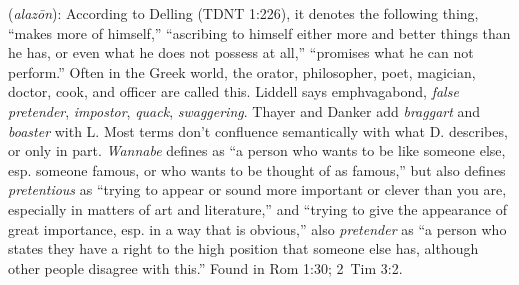 \item[Wannabe,]

(\textit{alazōn}):
According to Delling (TDNT 1:226), it denotes the following thing, ``makes more of himself,'' ``ascribing to himself either more and better things than he has, or even what he does not possess at all,'' ``promises what he can not perform.'' Often in the Greek world, the orator, philosopher, poet, magician, doctor, cook, and officer are called this. Liddell says emph{vagabond}, \emph{false pretender}, \emph{impostor}, \emph{quack}, \emph{swaggering}. Thayer and Danker add \emph{braggart} and \emph{boaster} with L. Most terms don't confluence semantically with what D. describes, or only in part. \emph{Wannabe} defines as ``a person who wants to be like someone else, esp. someone famous, or who wants to be thought of as famous,'' but also defines \emph{pretentious} as ``trying to appear or sound more important or clever than you are, especially in matters of art and literature,'' and ``trying to give the appearance of great importance, esp. in a way that is obvious,'' also \emph{pretender} as ``a person who states they have a right to the high position that someone else has, although other people disagree with this.''
Found in Rom 1:30; 2~Tim 3:2.

